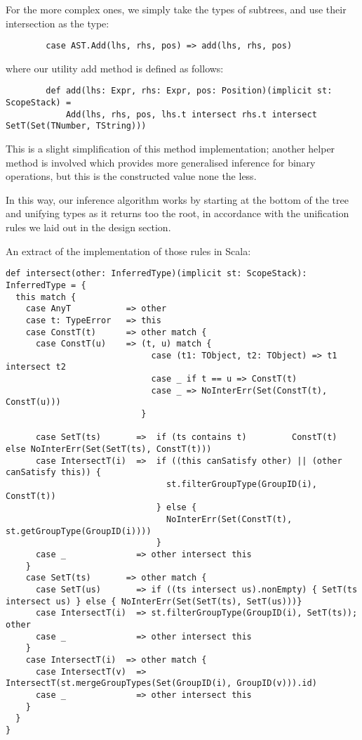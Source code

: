 \documentclass[british, twoside, openright]{bhamthesis}
\theoremstyle{definition}
\begin{document}
      For the more complex ones, we simply take the types of subtrees, and use their intersection as the type:

      \begin{lstlisting}
        case AST.Add(lhs, rhs, pos) => add(lhs, rhs, pos)
      \end{lstlisting}

      where our utility add method is defined as follows:

      \begin{lstlisting}
        def add(lhs: Expr, rhs: Expr, pos: Position)(implicit st: ScopeStack) =
            Add(lhs, rhs, pos, lhs.t intersect rhs.t intersect SetT(Set(TNumber, TString)))
      \end{lstlisting}

      This is a slight simplification of this method implementation; another helper method is involved which provides more generalised inference for binary operations, but this is the constructed value none the less.

      In this way, our inference algorithm works by starting at the bottom of the tree and unifying types as it returns too the root, in accordance with the unification rules we laid out in the design section.

      An extract of the implementation of those rules in Scala:

      \begin{lstlisting}
def intersect(other: InferredType)(implicit st: ScopeStack): InferredType = {
  this match {
    case AnyT           => other
    case t: TypeError   => this
    case ConstT(t)      => other match {
      case ConstT(u)    => (t, u) match {
                             case (t1: TObject, t2: TObject) => t1 intersect t2
                             case _ if t == u => ConstT(t)
                             case _ => NoInterErr(Set(ConstT(t), ConstT(u)))
                           }

      case SetT(ts)       =>  if (ts contains t)         ConstT(t) else NoInterErr(Set(SetT(ts), ConstT(t)))
      case IntersectT(i)  =>  if ((this canSatisfy other) || (other canSatisfy this)) {
                                st.filterGroupType(GroupID(i), ConstT(t))
                              } else {
                                NoInterErr(Set(ConstT(t), st.getGroupType(GroupID(i))))
                              }
      case _              => other intersect this
    }
    case SetT(ts)       => other match {
      case SetT(us)       => if ((ts intersect us).nonEmpty) { SetT(ts intersect us) } else { NoInterErr(Set(SetT(ts), SetT(us)))}
      case IntersectT(i)  => st.filterGroupType(GroupID(i), SetT(ts)); other
      case _              => other intersect this
    }
    case IntersectT(i)  => other match {
      case IntersectT(v)  => IntersectT(st.mergeGroupTypes(Set(GroupID(i), GroupID(v))).id)
      case _              => other intersect this
    }
  }
}
      \end{lstlisting}
\end{document}
